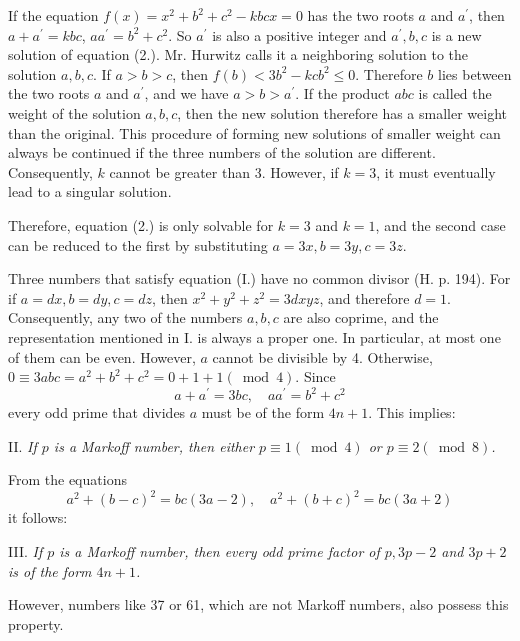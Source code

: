 \documentclass[12pt]{article}
\begin{document}
If the equation $f(x)=x^{2}+b^{2}+c^{2}-k b c x=0$ has the two roots $a$ and $a^{\prime}$, then $a+a^{\prime}=k b c$, $a a^{\prime}=b^{2}+c^{2}$. So $a^{\prime}$ is also a positive integer and $a^{\prime}, b, c$ is a new solution of equation (2.). Mr. Hurwitz calls it a neighboring solution to the solution $a, b, c$. If $a>b>c$, then $f(b)<3 b^{2}-k c b^{2} \leq 0$. Therefore $b$ lies between the two roots $a$ and $a^{\prime}$, and we have $a>b>a^{\prime}$. If the product $a b c$ is called the weight of the solution $a, b, c$, then the new solution therefore has a smaller weight than the original. This procedure of forming new solutions of smaller weight can always be continued if the three numbers of the solution are different. Consequently, $k$ cannot be greater than 3. However, if $k=3$, it must eventually lead to a singular solution.

Therefore, equation (2.) is only solvable for $k=3$ and $k=1$, and the second case can be reduced to the first by substituting $a=3 x, b=3 y, c=3 z$.

Three numbers that satisfy equation (I.) have no common divisor (H. p. 194). For if $a=d x, b=d y, c=d z$, then $x^{2}+y^{2}+z^{2}=3 d x y z$, and therefore $d=1$. Consequently, any two of the numbers $a, b, c$ are also coprime, and the representation mentioned in I. is always a proper one. In particular, at most one of them can be even. However, $a$ cannot be divisible by 4. Otherwise, $0 \equiv 3 a b c=a^{2}+b^{2}+c^{2}=0+1+1(\bmod 4)$. Since
\begin{equation*}
a+a^{\prime}=3 b c, \quad a a^{\prime}=b^{2}+c^{2} \tag{3.}
\end{equation*}
every odd prime that divides $a$ must be of the form $4n+1$. This implies:

\bigskip

II. \textit{If $p$ is a Markoff number, then either $p \equiv 1(\bmod 4)$ or $p \equiv 2(\bmod 8)$.}

\bigskip

From the equations
$$
a^{2}+(b-c)^{2}=b c(3 a-2), \quad a^{2}+(b+c)^{2}=b c(3 a+2)
$$
it follows:

\bigskip

III. \textit{If $p$ is a Markoff number, then every odd prime factor of $p, 3p-2$ and $3p+2$ is of the form $4n+1$.}

\bigskip

However, numbers like 37 or 61, which are not Markoff numbers, also possess this property.
\end{document}
